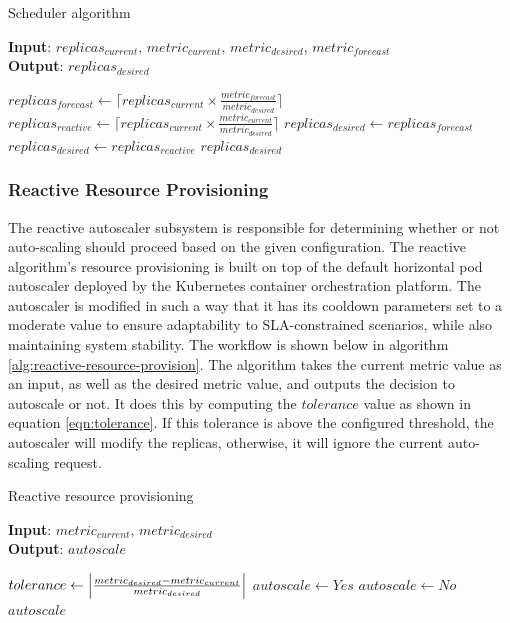 \begin{algorithm}
    \caption{Scheduler algorithm}
    \label{alg:scheduling-logic-daemon}
    \textbf{Input}: $replicas_{current},\, metric_{current},\, metric_{desired},\, metric_{forecast}$\\
    \textbf{Output}: $replicas_{desired}$
    \begin{algorithmic}
        \State $replicas_{forecast} \gets \lceil replicas_{current} \times \frac{metric_{forecast}}{metric_{desired}}\rceil$
        \State $replicas_{reactive} \gets \lceil replicas_{current} \times \frac{metric_{current}}{metric_{desired}}\rceil$
            \State $replicas_{desired} \gets replicas_{forecast}$
        \Else
            \State $replicas_{desired} \gets replicas_{reactive}$
        \EndIf
        \State \Return $replicas_{desired}$
    \end{algorithmic}
\end{algorithm}

\subsubsection{Reactive Resource Provisioning}

The reactive autoscaler subsystem is responsible for determining whether or not auto-scaling should proceed based on the given configuration. The reactive algorithm's resource provisioning is built on top of the default horizontal pod autoscaler deployed by the Kubernetes container orchestration platform. The autoscaler is modified in such a way that it has its cooldown parameters set to a moderate value to ensure adaptability to SLA-constrained scenarios, while also maintaining system stability. The workflow is shown below in algorithm \ref{alg:reactive-resource-provision}. The algorithm takes the current metric value as an input, as well as the desired metric value, and outputs the decision to autoscale or not. It does this by computing the $tolerance$ value as shown in equation \ref{eqn:tolerance}. If this tolerance is above the configured threshold, the autoscaler will modify the replicas, otherwise, it will ignore the current auto-scaling request.\par

\begin{algorithm}
    \caption{Reactive resource provisioning}
    \label{alg:reactive-resource-provision}
    \textbf{Input}: $metric_{current},\, metric_{desired}$\\
    \textbf{Output}: $autoscale$
    \begin{algorithmic}
        \State $tolerance \gets \abs{ \frac{metric_{desired} - metric_{current}}{metric_{desired}} }$
            \State $autoscale \gets Yes$
        \Else
            \State $autoscale \gets No$
        \EndIf
        \State \Return $autoscale$
    \end{algorithmic}
\end{algorithm}

